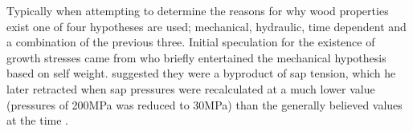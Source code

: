 Typically when attempting to determine the reasons for why wood properties exist
one of four hypotheses are used; mechanical, hydraulic, time dependent and a
combination of the previous three. Initial speculation for the existence of
growth stresses came from \cite{MARTLEY01011928} who briefly entertained the
mechanical hypothesis based on self weight. \cite{jacobs1945l} suggested they were a
byproduct of sap tension, which he later retracted when sap
pressures were recalculated at a much lower value (pressures of 200MPa was reduced to 30MPa) than the generally believed
values at the time \cite{jacobs1965l}. 
